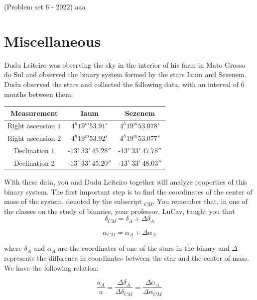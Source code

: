 \documentclass[11pt]{article}
\begin{document}
\begin{pproblem}(Problem set 6 - 2022)
aaa
\end{pproblem}

\newpage

\section{Miscellaneous}
\begin{pproblem} 
    Dudu Leiteiro was observing the sky in the interior of his farm in Mato Grosso do Sul and observed the binary system formed by the stars Iaum and Sezenem. Dudu observed the stars and collected the following data, with an interval of 6 months between them:
    \\
    \begin{center}
        \begin{tabular}{|c|c|c|}
            \hline %
            Measurement & Iaum & Sezenem   \\ 
            \hline
            Right ascension \(1\) & \(4^h19^m53.91^s\) & \(4^h19^m53.078^s\) \\
            Right ascension \(2\) & \(4^h19^m53.92^s\) & \(4^h19^m53.077^s\) \\
            Declination \(1\) & -\(13^\circ \ 33' \ 45.28''\) & -\(13^\circ \ 33' \ 47.78''\) \\
            Declination \(2\) & -\(13^\circ \ 33' \ 45.20''\) & -\(13^\circ \ 33' \ 48.03''\) \\
            \hline
        \end{tabular} 
\end{center}
    With these data, you and Dudu Leiteiro together will analyze properties of this binary system. The first important step is to find the coordinates of the center of mass of the system, denoted by the subscript \(_{CM}\). You remember that, in one of the classes on the study of binaries, your professor, LuCav, taught you that
    \[
    \delta_{CM} = \delta_A + \Delta\delta_A
    \]

    \[
    \alpha_{CM} = \alpha_A + \Delta\alpha_A
    \]

    where \(\delta_A\) and \(\alpha_A\) are the coordinates of one of the stars in the binary and \(\Delta\) represents the difference in coordinates between the star and the center of mass. We have the following relation:

    \[
    \frac{a_A}{a} = \frac{\Delta\delta_A}{\Delta\delta_{CM}} = \frac{\Delta\alpha_A}{\Delta\alpha_{CM}}
    \]


\end{pproblem}
\end{document}
